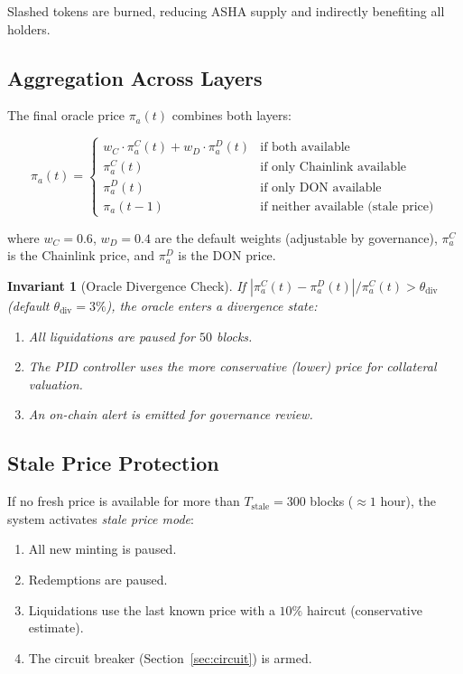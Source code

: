 \documentclass[11pt,a4paper]{article}
\newcommand{\asha}{\textsc{ASHA}\xspace}
\newtheorem{invariant}{Invariant}
\begin{document}
Slashed tokens are burned, reducing \asha supply and indirectly benefiting all holders.

\subsection{Aggregation Across Layers}

The final oracle price $\pi_a(t)$ combines both layers:

\begin{equation}
  \pi_a(t) = \begin{cases}
    w_C \cdot \pi_a^{C}(t) + w_D \cdot \pi_a^{D}(t) & \text{if both available} \\
    \pi_a^{C}(t) & \text{if only Chainlink available} \\
    \pi_a^{D}(t) & \text{if only DON available} \\
    \pi_a(t-1) & \text{if neither available (stale price)}
  \end{cases}
  \label{eq:oracle_agg}
\end{equation}

where $w_C = 0.6$, $w_D = 0.4$ are the default weights (adjustable by governance), $\pi_a^C$ is the Chainlink price, and $\pi_a^D$ is the DON price.

\begin{invariant}[Oracle Divergence Check]
If $|\pi_a^C(t) - \pi_a^D(t)| / \pi_a^C(t) > \theta_{\text{div}}$ (default $\theta_{\text{div}} = 3\%$), the oracle enters a \emph{divergence state}:
\begin{enumerate}
  \item All liquidations are paused for $50$ blocks.
  \item The PID controller uses the more conservative (lower) price for collateral valuation.
  \item An on-chain alert is emitted for governance review.
\end{enumerate}
\end{invariant}

\subsection{Stale Price Protection}

If no fresh price is available for more than $T_{\text{stale}} = 300$ blocks ($\approx 1$ hour), the system activates \emph{stale price mode}:

\begin{enumerate}
  \item All new minting is paused.
  \item Redemptions are paused.
  \item Liquidations use the last known price with a $10\%$ haircut (conservative estimate).
  \item The circuit breaker (Section~\ref{sec:circuit}) is armed.
\end{enumerate}
\end{document}
